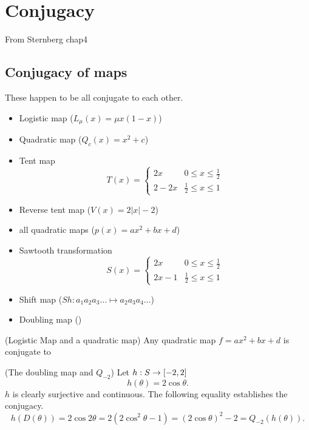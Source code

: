 \documentclass[12pt]{book}
\begin{document}
\section{Conjugacy}
From Sternberg chap4
\subsection{Conjugacy of maps}
These happen to be all conjugate to each other.
\begin{itemize}
  \item Logistic map ($L_\mu(x) = \mu x(1-x)$)
  \item Quadratic map ($Q_c(x) = x^2 + c$)
  \item Tent map 
    \begin{equation*}
      T(x) = 
      \begin{cases}
        2x & 0 \leq x \leq \frac{1}{2}      \\
        2 - 2x & \frac{1}{2} \leq x \leq 1
      \end{cases}
    \end{equation*}
  \item Reverse tent map ($V(x) = 2|x| - 2$)
  \item all quadratic maps ($p(x) = ax^2 + bx + d$)
  \item Sawtooth transformation 
    \begin{equation*}
      S(x) = 
      \begin{cases}
        2x     & 0 \leq x \leq \frac{1}{2}      \\
        2x - 1 & \frac{1}{2} \leq x \leq 1
      \end{cases}
    \end{equation*}
  \item Shift map ($Sh: a_1a_2a_3\ldots \mapsto a_2a_3a_4\ldots$)
  \item Doubling map ()
\end{itemize}

\begin{proposition}
  (Logistic Map and a quadratic map)
  Any quadratic map $f = ax^2 + bx + d$ is conjugate to 
\end{proposition}

\begin{proposition}
  (The doubling map and $Q_{-2}$)
  Let $h: S \rightarrow [-2,2]$
  \begin{equation*}
    h(\theta) = 2\cos\theta.
  \end{equation*}
  $h$ is clearly surjective and continuous.
  The following equality establishes the conjugacy.
  \begin{equation*}
    h(D(\theta)) = 2\cos2\theta = 2(2\cos^2\theta - 1) = (2\cos\theta)^2 - 2 = Q_{-2}(h(\theta)).
  \end{equation*}
\end{proposition}
\end{document}
